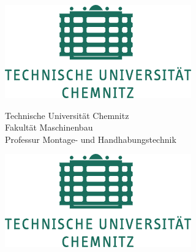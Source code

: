 \begin{titlepage}
	
\begin{figure}[htbp]
	\begin{minipage}{0.19\textwidth}
		\includegraphics[width=\textwidth]{img/logo_tuc.pdf}
	\end{minipage}
	\hfill
	\begin{minipage}{0.6\textwidth} 
		\begin{center}	
			Technische Universität Chemnitz\\
			Fakultät Maschinenbau\\
			Professur Montage- und Handhabungstechnik
		\end{center}
	\end{minipage}
	\hfill
	\begin{minipage}{0.19\textwidth} 
		\includegraphics[width=\textwidth]{img/logo_tuc.pdf}
	\end{minipage}
\end{figure}
	
	
	\vspace*{1cm}
		

\end{titlepage}
